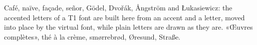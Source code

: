 \documentclass{article}
\begin{document}
Café, naïve, façade, señor, Gödel, Dvořák, Ångström and Łukasiewicz: the
accented letters of a T1 font are built here from an accent and a letter,
moved into place by the virtual font, while plain letters are drawn as they
are. «Œuvres complètes», thé à la crème, smørrebrød, Øresund, Straße.
\end{document}
